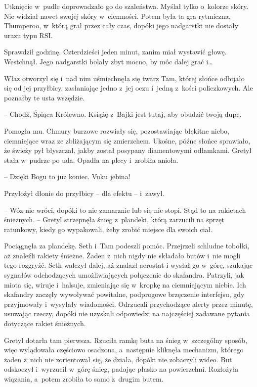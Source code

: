 \documentclass[oneside,polish,11pt,sfheadings]{mwbk}
\begin{document}
Utknięcie w~pudle doprowadzało go do szaleństwa. Myślał tylko o~kolorze
skóry. Nie widział nawet swojej skóry w~ciemności. Potem była ta gra
rytmiczna, Thumperoo, w~którą grał przez cały czas, dopóki jego
nadgarstki nie dostały urazu typu RSI.

Sprawdził godzinę. Czterdzieści jeden minut, zanim miał wystawić głowę.
Westchnął. Jego nadgarstki bolały zbyt mocno, by móc dalej grać i\ldots 

Właz otworzył się i~nad nim uśmiechnęła się twarz Tam, której słońce
odbijało się od jej przyłbicy, zasłaniając jedno z~jej oczu i~jedną z~kości policzkowych. Ale poznałby te usta wszędzie.

-- Chodź, Śpiąca Królewno. Książę z~Bajki jest tutaj, aby obudzić twoją
dupę.

Pomogła mu. Chmury burzowe rozwiały się, pozostawiając błękitne niebo,
ciemniejące wraz ze zbliżającym się zmierzchem. Ukośne, późne słońce
sprawiało, że świeży pył błyszczał, jakby został posypany diamentowymi
odłamkami. Gretyl stała w~pudrze po uda. Opadła na plecy i~zrobiła
anioła. 

-- Dzięki Bogu to już koniec. Vuku jebina!

Przyłożył dłonie do przyłbicy -- dla efektu -- i~zawył.

-- Wóz nie wróci, dopóki to nie zamarznie lub się nie stopi. Stąd to na
rakietach śnieżnych. -- Gretyl strzepnęła śnieg z~plandeki, którą
zarzucili na sprzęt ratunkowy, kiedy go wypakowali, żeby zrobić miejsce
dla swoich ciał.

Pociągnęła za plandekę. Seth i~Tam podeszli pomóc. Przejrzeli schludne
tobołki, aż znaleźli rakiety śnieżne. Żaden z~nich nigdy nie składało
butów i~nie mogli tego rozgryźć. Seth walczył dalej, aż znalazł aerostat
i wysłał go w~górę, szukając sygnałów odchodzących umożliwiających
połączenie do skafandra. Patrzyli, jak miota się, wiruje i~halsuje,
zmieniając się w~kropkę na ciemniejącym niebie. Ich skafandry zaczęły
wywoływać powitalne, podprogowe brzęczenie interfejsu, gdy przyjmowały i~wysyłały wiadomości. Odrzucali przychodzące alerty przez minutę,
usuwając rzeczy, dopóki nie uzyskali odpowiedzi na najczęściej zadawane
pytania dotyczące rakiet śnieżnych.

Gretyl dotarła tam pierwsza. Rzuciła ramkę buta na śnieg w~szczególny
sposób, więc wylądowała częściowo osadzona, a~następnie kliknęła
mechanizm, którego żaden z~nich nie zorientował się, że działa, dopóki
nie zobaczyli wideo. But odskoczył i~wyrzucił w~górę śnieg, padając
płasko na powierzchni. Rozłożyła wiązania, a~potem zrobiła to samo z~drugim butem.
\end{document}
